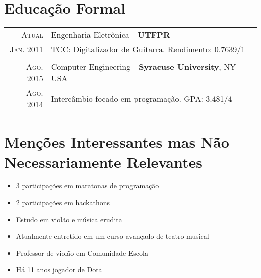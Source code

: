 \section{Educação Formal}
\begin{tabular}{rl}
	\textsc{Atual} & Engenharia Eletrônica - \textbf{UTFPR}\\
	\textsc{Jan. 2011}& \small TCC: Digitalizador de Guitarra. Rendimento: 0.7639/1\\
	\\
	\textsc{Ago. 2015} & Computer Engineering - \textbf{Syracuse University}, NY - USA\\
	\textsc{Ago. 2014} & \small Intercâmbio focado em programação. GPA: 3.481/4\\
\end{tabular}

\section{Menções Interessantes mas Não Necessariamente Relevantes}
\begin{itemize}
	\item 3 participações em maratonas de programação
	\item 2 participações em hackathons
	\item Estudo em violão e música erudita
	\item Atualmente entretido em um curso avançado de teatro musical
	\item Professor de violão em Comunidade Escola
	\item Há 11 anos jogador de Dota
\end{itemize}




